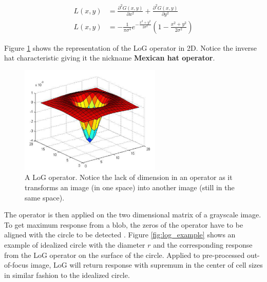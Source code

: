 \documentclass[pdftex,12pt,a4paper]{report}
\begin{document}
\begin{equation*}
\begin{aligned}
L(x, y) & = \frac{\partial^2 G(x, y)}{\partial x^2} + \frac{\partial^2 G(x, y)}{\partial y^2} \\ 
L(x, y) & = - \frac{1}{\pi \sigma^4} e^{-\frac{x^2 + y^2}{2\sigma^2}} \left( 1 - \frac{x^2 + y^2}{2 \sigma^2}\right)
\end{aligned}
\label{eq:log_2d_expansion}
\end{equation*}

Figure \ref{fig:log_operator} shows the representation of the LoG operator in 2D. Notice the inverse hat characteristic giving it the nickname \textbf{Mexican hat operator}.

\begin{figure}[H]
\centering
\includegraphics[width=0.6\textwidth]{images/log_operator}
\caption[A example of the LoG operator]{A LoG operator. Notice the lack of dimension in an operator as it transforms an image (in one space) into another image (still in the same space).}
\label{fig:log_operator}
\end{figure}

The operator is then applied on the two dimensional matrix of a grayscale image. To get maximum response from a blob, the zeros of the operator have to be aligned with the circle to be detected \cite{marr1980theory}. Figure \ref{fig:log_example} shows an example of idealized circle with the diameter $r$ and the corresponding response from the LoG operator on the surface of the circle. Applied to pre-processed out-of-focus image, LoG will return response with supremum in the center of cell sizes in similar fashion to the idealized circle.
\end{document}
